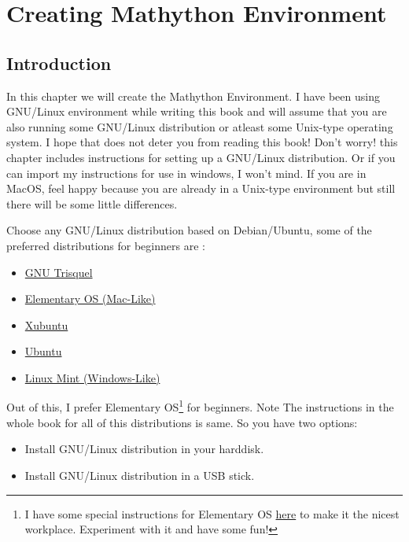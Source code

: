 
\chapter{Creating Mathython Environment}

\section{Introduction}

In this chapter we will create the {\color{magenta} Mathython}  Environment. I have been using GNU/Linux environment while writing this book
and will assume that you are also running some GNU/Linux distribution or atleast some Unix-type operating system. I hope that
does not deter you from reading this book! {\color{magenta} Don't worry! this chapter includes instructions for setting up a GNU/Linux distribution.}
Or if you can import my instructions for use in windows, I won't mind. If you are in MacOS, feel happy because you are already
in a Unix-type environment but still there will be some little differences.

Choose any GNU/Linux distribution based on Debian/Ubuntu, some of the preferred distributions for beginners are :

\begin{itemize}
\item \href{http://trisquel.info/}{GNU Trisquel}
\item \href{http://elementary.io}{Elementary OS (Mac-Like)}
\item \href{http://xubuntu.org}{Xubuntu}
\item \href{http://www.ubuntu.com}{Ubuntu}
\item \href{http://linuxmint.com}{Linux Mint (Windows-Like)}
\end{itemize}

Out of this, I prefer {\color{magenta} Elementary OS}\footnote{I have some special instructions for Elementary OS \href{http://itsfoss.com/top-ten-installing-elementary-os-luna/}{here} to make it the nicest workplace. Experiment with it and have some fun!} for beginners. Note The instructions in the whole book for all of this distributions is same.
So you have two options:
\begin{itemize}
\item Install GNU/Linux distribution in your harddisk.
\item Install GNU/Linux distribution in a USB stick.
\end{itemize}


